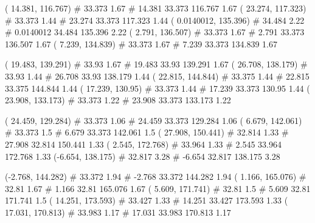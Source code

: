 \documentclass[a4paper,openbib,10pt]{article}
\newenvironment{treegraph}{\begin{graph}}{\end{graph}}
\begin{document}
\begin{treegraph}
  ( 14.381, 116.767) #     33.373    1.67
   #    14.381    33.373    116.767    1.67
  ( 23.274, 117.323) #     33.373    1.44
   #    23.274    33.373    117.323    1.44
  ( 0.0140012, 135.396) #     34.484    2.22
   #    0.0140012    34.484    135.396    2.22
  ( 2.791, 136.507) #     33.373    1.67
   #    2.791    33.373    136.507    1.67
  ( 7.239, 134.839) #     33.373    1.67
   #    7.239    33.373    134.839    1.67

  ( 19.483, 139.291) #     33.93    1.67
   #    19.483    33.93    139.291    1.67
  ( 26.708, 138.179) #     33.93    1.44
   #    26.708    33.93    138.179    1.44
  ( 22.815, 144.844) #     33.375    1.44
   #    22.815    33.375    144.844    1.44
  ( 17.239, 130.95) #     33.373    1.44
   #    17.239    33.373    130.95    1.44
  ( 23.908, 133.173) #     33.373    1.22
   #    23.908    33.373    133.173    1.22

  ( 24.459, 129.284) #     33.373    1.06
   #    24.459    33.373    129.284    1.06
  ( 6.679, 142.061) #     33.373    1.5
   #    6.679    33.373    142.061    1.5
  ( 27.908, 150.441) #     32.814    1.33
   #    27.908    32.814    150.441    1.33
  ( 2.545, 172.768) #     33.964    1.33
   #    2.545    33.964    172.768    1.33
  (-6.654, 138.175) #     32.817    3.28
   #    -6.654    32.817    138.175    3.28

  (-2.768, 144.282) #     33.372    1.94
   #    -2.768    33.372    144.282    1.94
  ( 1.166, 165.076) #     32.81    1.67
   #    1.166    32.81    165.076    1.67
  ( 5.609, 171.741) #     32.81    1.5
   #    5.609    32.81    171.741    1.5
  ( 14.251, 173.593) #     33.427    1.33
   #    14.251    33.427    173.593    1.33
  ( 17.031, 170.813) #     33.983    1.17
   #    17.031    33.983    170.813    1.17


\end{treegraph}
\end{document}
